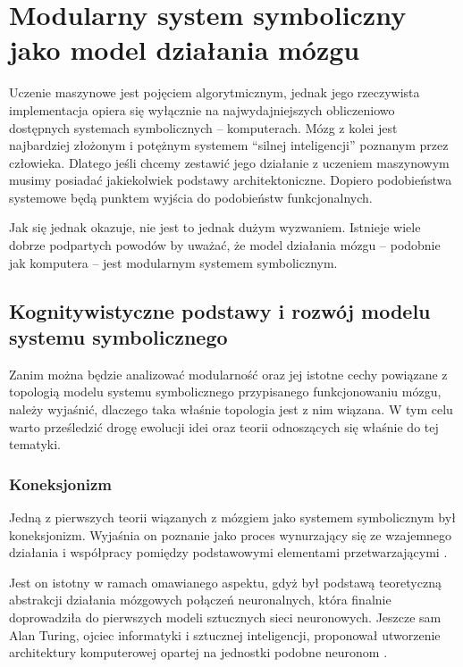 \chapter{Modularny system symboliczny jako model działania mózgu}

Uczenie maszynowe jest pojęciem algorytmicznym, jednak jego rzeczywista implementacja opiera się wyłącznie na najwydajniejszych obliczeniowo dostępnych systemach symbolicznych -- komputerach.
Mózg z kolei jest najbardziej złożonym i potężnym systemem ``silnej inteligencji'' poznanym przez człowieka.
Dlatego jeśli chcemy zestawić jego działanie z uczeniem maszynowym musimy posiadać jakiekolwiek podstawy architektoniczne.
Dopiero podobieństwa systemowe będą punktem wyjścia do podobieństw funkcjonalnych.

Jak się jednak okazuje, nie jest to jednak dużym wyzwaniem.
Istnieje wiele dobrze podpartych powodów by uważać, że model działania mózgu -- podobnie jak komputera -- jest modularnym systemem symbolicznym.

\section{Kognitywistyczne podstawy i rozwój modelu systemu symbolicznego}
\label{cognitive-basics}

Zanim można będzie analizować modularność oraz jej istotne cechy powiązane z topologią modelu systemu symbolicznego przypisanego funkcjonowaniu mózgu, należy wyjaśnić, dlaczego taka właśnie topologia jest z nim wiązana.
W tym celu warto prześledzić drogę ewolucji idei oraz teorii odnoszących się właśnie do tej tematyki.

\subsection{Koneksjonizm}

Jedną z pierwszych teorii wiązanych z mózgiem jako systemem symbolicznym był koneksjonizm.
Wyjaśnia on poznanie jako proces wynurzający się ze wzajemnego działania i współpracy pomiędzy podstawowymi elementami przetwarzającymi \cite{bechtel1993case}.

Jest on istotny w ramach omawianego aspektu, gdyż był podstawą teoretyczną abstrakcji działania mózgowych połączeń neuronalnych, która finalnie doprowadziła do pierwszych modeli sztucznych sieci neuronowych.
Jeszcze sam Alan Turing, ojciec informatyki i sztucznej inteligencji, proponował utworzenie architektury komputerowej opartej na jednostki podobne neuronom \cite{copeland1996alan}.

